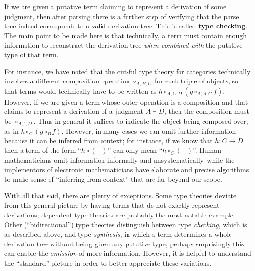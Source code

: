 \documentclass{book}
\let\types\vdash
\begin{document}
If we are given a putative term claiming to represent a derivation of some judgment, then after parsing there is a further step of verifying that the parse tree indeed corresponds to a valid derivation tree.
This is called \textbf{type-checking}.
The main point to be made here is that technically, a term must contain enough information to reconstruct the derivation tree \emph{when combined with} the putative type of that term.

For instance, we have noted that the cut-ful type theory for categories technically involves a different composition operation $\circ_{A,B,C}$ for each triple of objects, so that terms would technically have to be written as $h\circ_{A,C,D} (g\circ_{A,B,C} f)$.
However, if we are given a term whose outer operation is a composition and that claims to represent a derivation of a judgment $A\types D$, then the composition must be $\circ_{A,?,D}$.
Thus in general it suffices to indicate the object being composed over, as in $h\circ_C (g\circ_B f)$.
However, in many cases we can omit further information because it can be inferred from context; for instance, if we know that $h:C\to D$ then a term of the form ``$h\circ (-)$'' can only mean ``$h\circ_C (-)$''.
Human mathematicians omit information informally and unsystematically, while the implementors of electronic mathematicians have elaborate and precise algorithms to make sense of ``inferring from context'' that are far beyond our scope.

With all that said, there are plenty of exceptions.
Some type theories deviate from this general picture by having terms that do not exactly represent derivations; dependent type theories are probably the most notable example.
Other (``bidirectional'') type theories distinguish between type \emph{checking}, which is as described above, and type \emph{synthesis}, in which a term determines a whole derivation tree without being given any putative type; perhaps surprisingly this can enable the \emph{omission} of more information.
However, it is helpful to understand the ``standard'' picture in order to better appreciate these variations.




\end{document}
